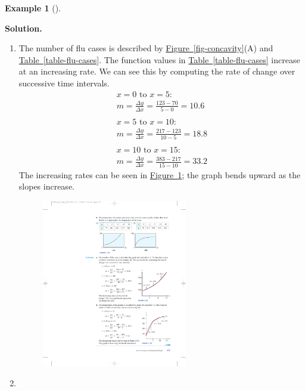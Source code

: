 \documentclass[10pt,]{book}
\theoremstyle{plain}
\theoremstyle{definition}
\theoremstyle{definition}
\theoremstyle{definition}
\newtheorem{example}[theorem]{Example}
\theoremstyle{definition}
\theoremstyle{definition}
\numberwithin{equation}{section}
\begin{document}
\begin{example}[]
\begin{figure}
\end{figure}
\par\medskip\noindent%
\textbf{Solution.}\quad \leavevmode%
\begin{enumerate}[label=*\alph**]
\item\hypertarget{li-325}{}The number of flu cases is described by \hyperref[fig-concavity]{Figure~\ref{fig-concavity}}(A) and \hyperref[table-flu-cases]{Table~\ref{table-flu-cases}}. The function values in \hyperref[table-flu-cases]{Table~\ref{table-flu-cases}} increase at an increasing rate. We can see this by computing the rate of change over successive time intervals. 
        \begin{gather*}
x = 0 \text{ to } x = 5: \\
m = \frac{\Delta y}{\Delta x}=\frac{123−70}{5−0} = 10.6\\
\\
 x = 5\text{ to }  x = 10:\\
 m = \frac{\Delta y}{\Delta x}=\frac{217−123}{10−5} = 18.8\\
\\
x = 10 \text{ to } x = 15:\\
m = \frac{\Delta y}{\Delta x} 
            =\frac{383 − 217}{15 − 10} = 33.2
\end{gather*}
        The increasing rates can be seen in \hyperref[fig-concave-up]{Figure~\ref{fig-concave-up}}; the graph bends upward as the slopes increase.
\leavevmode%
\begin{figure}
\centering
\includegraphics[width=0.60\textwidth,]{images/fig-concave-up.pdf}\caption{\label{fig-concave-up}}
\end{figure}
\item\hypertarget{li-326}{}

\end{enumerate}
\end{example}
\end{document}
